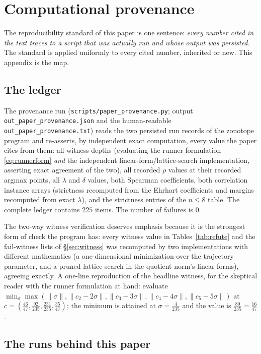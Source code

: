 \documentclass[11pt,a4paper]{article}
\numberwithin{equation}{section}
\theoremstyle{plain}
\theoremstyle{definition}
\theoremstyle{remark}
\newcommand{\wnc}[1]{\lVert #1 \rVert}
\begin{document}
\section{Computational provenance}\label{sec:prov}

The reproducibility standard of this paper is one sentence:
\emph{every number cited in the text traces to a script that was
actually run and whose output was persisted.} The standard is applied
uniformly to every cited number, inherited or new. This appendix is
the map.

\subsection{The ledger}

The provenance run (\texttt{scripts/paper\_provenance.py}; output
\texttt{out\_paper\_provenance.json} and the human-readable
\texttt{out\_paper\_provenance.txt}) reads the two persisted run records
of the zonotope program and re-asserts, by independent exact
computation, every value the paper cites from them: all witness depths
(evaluating the runner formulation \eqref{eq:runnerform} \emph{and} the
independent linear-form/lattice-search implementation, asserting exact
agreement of the two), all recorded $\rho$ values at their recorded
argmax points, all $\lambda$ and $\delta$ values, both Spearman
coefficients, both correlation instance arrays (strictness recomputed
from the Ehrhart coefficients and margins recomputed from exact
$\lambda$), and the strictness entries of the $n\le8$ table. The
complete ledger contains $225$ items. The number of failures is $0$.

The two-way witness verification deserves emphasis because it is the
strongest form of check the program has: every witness value in
Tables~\ref{tab:refute} and the fail-witness lists of
\S\ref{sec:witness} was recomputed by two implementations with different
mathematics (a one-dimensional minimization over the trajectory
parameter, and a pruned lattice search in the quotient norm's linear
forms), agreeing exactly. A one-line reproduction of the headline
witness, for the skeptical reader with the runner formulation at
hand: evaluate
$\min_\sigma\max(\wnc\sigma,\wnc{c_2-2\sigma},\wnc{c_3-3\sigma},
\wnc{c_4-4\sigma},\wnc{c_5-5\sigma})$ at
$c=(\tfrac{46}{47},\tfrac{92}{235},\tfrac{231}{235},\tfrac{35}{47})$;
the minimum is attained at $\sigma=\tfrac{4}{235}$ and the value is
$\tfrac{80}{235}=\tfrac{16}{47}$.

\subsection{The runs behind this paper}
\end{document}
